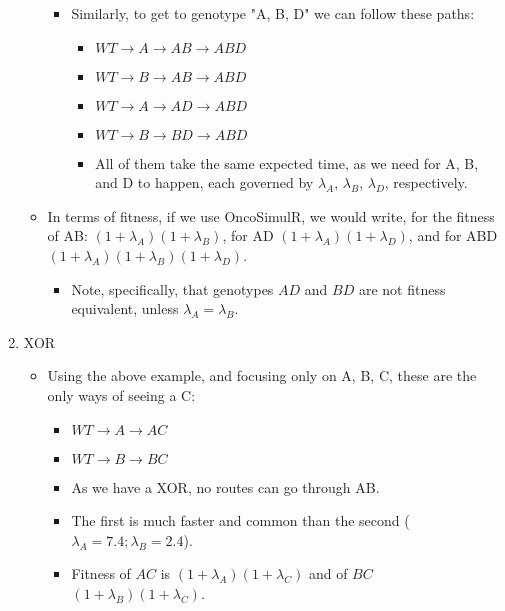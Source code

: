 \documentclass[11pt]{article}
\begin{document}
\begin{enumerate}
\begin{itemize}
\begin{itemize}
\item Similarly, to get to genotype "A, B, D" we can follow these paths:
\begin{itemize}
\item \(WT \rightarrow A \rightarrow AB \rightarrow ABD\)
\item \(WT \rightarrow B \rightarrow AB \rightarrow ABD\)
\item \(WT \rightarrow A \rightarrow AD \rightarrow ABD\)
\item \(WT \rightarrow B \rightarrow BD \rightarrow ABD\)
\item All of them take the same expected time, as we need for A, B, and D to happen, each governed by \(\lambda_A\), \(\lambda_B\), \(\lambda_D\), respectively.
\end{itemize}
\end{itemize}
\item In terms of fitness, if we use OncoSimulR, we would write, for the fitness of AB: \((1 + \lambda_A) (1 + \lambda_B)\), for AD \((1 + \lambda_A) (1 + \lambda_D)\), and for ABD \((1 + \lambda_A) (1 + \lambda_B) (1 + \lambda_D)\).
\begin{itemize}
\item Note, specifically, that genotypes \(AD\) and \(BD\) are not fitness equivalent, unless \(\lambda_A = \lambda_B\).
\end{itemize}
\end{itemize}
\item XOR
\label{sec:orgc1e93a8}
\begin{itemize}
\item Using the above example, and focusing only on A, B, C, these are the only ways of seeing a C:
\begin{itemize}
\item \(WT \rightarrow A \rightarrow AC\)
\item \(WT \rightarrow B \rightarrow BC\)
\item As we have a XOR, no routes can go through AB.
\item The first is much faster and common than the second (\(\lambda_A = 7.4; \lambda_B = 2.4\)).
\item Fitness of \(AC\) is \((1 + \lambda_A) (1 + \lambda_C)\) and of \(BC\) \((1 + \lambda_B) (1 + \lambda_C)\).
\end{itemize}
\end{itemize}


\end{enumerate}
\end{document}
